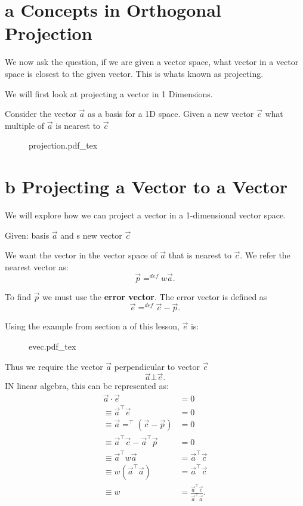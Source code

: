 \documentclass[12pt]{book}
\title{\coursetitle\linebreak\lecturename}
\author{\\Cain Susko\\ 
           \\ \\ \\
      Queen's University 
    \\School of Computing\\}
\newcommand{\incfig}[1]{%
    {#1.pdf_tex}
}
\begin{document}
\begin{titlepage}
        \maketitle
\end{titlepage}


\section*{a Concepts in Orthogonal Projection}
We now ask the question, if we are given a vector space, what vector in a vector space is closest to the given vector.
This is whats known as projecting.

We will first look at projecting a vector in 1 Dimensions.

Consider the vector $\vec a$ as a basis for a 1D space. Given a new vector  $\vec c$ what multiple of  $\vec a$ is nearest to 
        $\vec c$
\begin{figure}[h]
        \centering
        \incfig{projection}
\end{figure}


\section*{b Projecting a Vector to a Vector}
We will explore how we can project a vector in a 1-dimensional vector space.

Given: basis $\vec a$ and s new vector  $\vec c$

We want the vector in the vector space of  $\vec a$ that is nearest to  $\vec c$. 
We refer the nearest vector as:
\[
\vec p =^{def}w\vec a
.\] 

To find $\vec p$ we must use the \textbf{error vector}. The error vector is defined as
 \[
\vec e =^{def} \vec c - \vec p
.\] 
\pagebreak

Using the example from section a of this lesson, $\vec e$ is:
 \begin{figure}[h]
        \centering
        \incfig{evec}
\end{figure}

Thus we require the vector $\vec a$ perpendicular to vector  $\vec e$
 \[
\vec a \bot \vec e
.\] 
IN linear algebra, this can be represented as:
\begin{align*}
        \vec a \cdot \vec e &= 0\\
        \equiv \vec a^\top\vec e &=0\\
        \equiv \vec a =^\top(\vec c-\vec p) &= 0\\
        \equiv \vec a^\top \vec c - \vec a^\top \vec p &= 0\\
        \equiv \vec a^\top w\vec a &= \vec a^\top\vec c\\
        \equiv w(\vec a^\top \vec a) &=\vec a^\top \vec c\\
        \equiv w &= \frac{\vec a^\top \vec c}{\vec a^\top \vec a} 
.\end{align*}
\end{document}
